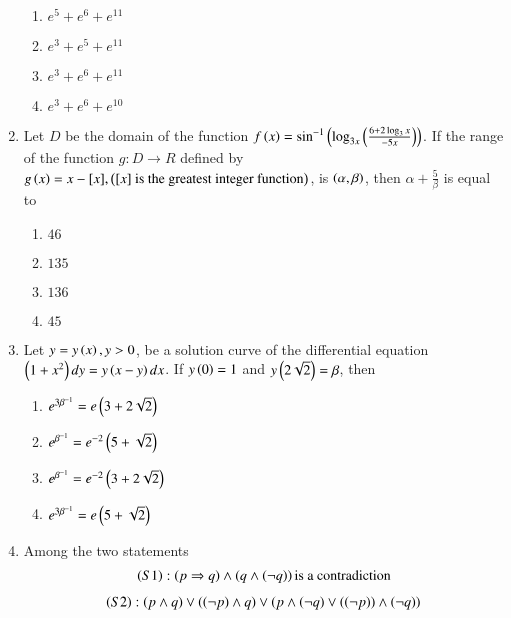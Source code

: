 \documentclass[journal,12pt,twocolumn]{IEEEtran}
\theoremstyle{remark}
\begin{document}
\begin{enumerate}
\begin{multicols}{2}
\begin{enumerate}
    \item $e^5+e^6+e^{11}$
    \item $e^3+e^5+e^{11}$
    \item $e^3+e^6+e^{11}$
    \item $e^3+e^6+e^{10}$
\end{enumerate}
\end{multicols}
\bigskip
\item Let $D$ be the domain of the function $f\left(x\right)=\sin^{-1}{\left(\log_{3x}\left(\frac{6+2\log_3 x}{-5x}\right)\right)}$. If the range of the function $g:D\rightarrow R$ defined by $g\left(x\right)=x-[x],\left([x]\text{ is the greatest  integer function}\right)$, is $\left(\alpha,\beta\right)$, then $\alpha+\frac{5}{\beta}$ is equal to 
\begin{multicols}{2}
\begin{enumerate}
       \item $46$
       \item $135$
       \item $136$
       \item $45$
\end{enumerate}
\end{multicols}
\bigskip
\item Let $y=y\left(x\right),y>0$, be a solution curve of the differential equation $\left(1+x^2\right)dy=y\left(x-y\right)dx$. If $y\left(0\right)=1$ and $y\left(2\sqrt{2}\right)=\beta$, then
\begin{multicols}{2}
\begin{enumerate}
    \item $e^{3\beta^{-1}}=e\left(3+2\sqrt{2}\right)$
    \item $e^{\beta^{-1}}=e^{-2}\left(5+\sqrt{2}\right)$
    \item $e^{\beta^{-1}}=e^{-2}\left(3+2\sqrt{2}\right)$
    \item $e^{3\beta^{-1}}=e\left(5+\sqrt{2}\right)$
\end{enumerate}
\end{multicols}
\bigskip
\item Among the two statements 
\begin{align*}
    \left(S1\right):\left(p\Rightarrow q\right)\land \left(q\land\left(\neg q\right)\right) \text{is a contradiction}
\end{align*}
\begin{align*}
    \brak{S2}:\brak{p\land q}\lor \brak{\brak{\neg p}\land q}\lor \brak{p \land \brak{\neg q}\lor \brak{\brak{\neg p}}\land\brak{\neg q}}

\end{align*}
\end{enumerate}
\end{document}
